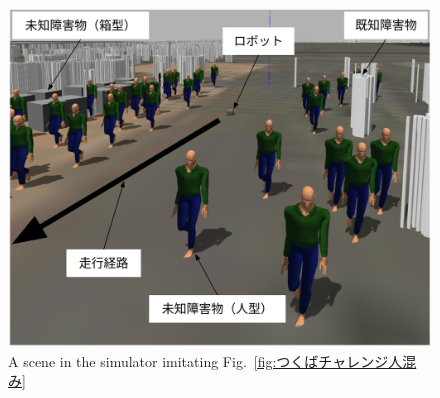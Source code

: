 \documentclass{jarticle}
\begin{document}



\begin{figure}[htbp]
  \centering
   \includegraphics[width=0.8\linewidth]{fig/hitogomi_gazebo.png}
	\caption{A scene in the simulator imitating Fig.~\ref{fig:つくばチャレンジ人混み}} 
   \label{fig:人混みガゼボ}
\end{figure}
\end{document}
